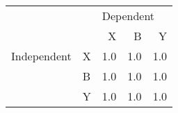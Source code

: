 \begin{tabular}{llrrr}
\toprule
            &   & \multicolumn{3}{l}{Dependent} \\
            &   &         X &    B &    Y \\
\midrule
Independent & X &       1.0 &  1.0 &  1.0 \\
            & B &       1.0 &  1.0 &  1.0 \\
            & Y &       1.0 &  1.0 &  1.0 \\
\bottomrule
\end{tabular}

